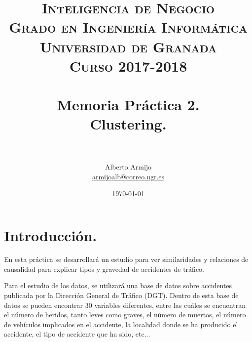 

\title{	
	\normalfont \normalsize 
	\textsc{\textbf{Inteligencia de Negocio} \\ Grado en Ingeniería Informática \\ Universidad de Granada \\
	Curso 2017-2018} \\ [25pt] %
	\horrule{0.5pt} \\[0.4cm] %
	\huge Memoria Práctica 2. \\
	\huge Clustering.
	\\ %
	\horrule{2pt} \\[0.5cm] %
}

\author{Alberto Armijo  \\
\href{mailto:armijoalb@correo.ugr.es}{armijoalb@correo.ugr.es}} %
\date{\normalsize\today} %



	
	\maketitle %
	
	\newpage %
	
	\tableofcontents %
	
	\listoffigures %
	
	\listoftables %
	
	\newpage
	
	\section[Introducción]{Introducción.}
	En esta práctica se desarrollará un estudio para ver similaridades y relaciones de causalidad para explicar tipos y gravedad de accidentes de tráfico.
	
	\vspace{0.06in}
	Para el estudio de los datos, se utilizará una base de datos sobre accidentes publicada por la Dirección General de Tráfico (DGT). Dentro de esta base de datos se pueden encontrar 30 variables diferentes, entre las cuáles se encuentran el número de heridos, tanto leves como graves, el número de muertos, el número de vehículos implicados en el accidente, la localidad donde se ha producido el accidente, el tipo de accidente que ha sido, etc...
	
